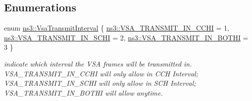 \subsection*{Enumerations}
\begin{DoxyCompactItemize}
\item 
enum \hyperlink{namespacens3_a417ab130a77d452a8b5014090665bcc1}{ns3\+::\+Vsa\+Transmit\+Interval} \{ \hyperlink{namespacens3_a417ab130a77d452a8b5014090665bcc1a2892e80beed7d3cc2ec6a4b8acf05676}{ns3\+::\+V\+S\+A\+\_\+\+T\+R\+A\+N\+S\+M\+I\+T\+\_\+\+I\+N\+\_\+\+C\+C\+HI} = 1, 
\hyperlink{namespacens3_a417ab130a77d452a8b5014090665bcc1ad75f8ae4d4ec6a1ded6834e982a7149d}{ns3\+::\+V\+S\+A\+\_\+\+T\+R\+A\+N\+S\+M\+I\+T\+\_\+\+I\+N\+\_\+\+S\+C\+HI} = 2, 
\hyperlink{namespacens3_a417ab130a77d452a8b5014090665bcc1aae42365483bb4ad44a43f5e31f4a3495}{ns3\+::\+V\+S\+A\+\_\+\+T\+R\+A\+N\+S\+M\+I\+T\+\_\+\+I\+N\+\_\+\+B\+O\+T\+HI} = 3
 \}\begin{DoxyCompactList}\small\item\em indicate which interval the V\+SA frames will be transmitted in. V\+S\+A\+\_\+\+T\+R\+A\+N\+S\+M\+I\+T\+\_\+\+I\+N\+\_\+\+C\+C\+HI will only allow in C\+CH Interval; V\+S\+A\+\_\+\+T\+R\+A\+N\+S\+M\+I\+T\+\_\+\+I\+N\+\_\+\+S\+C\+HI will only allow in S\+CH Interval; V\+S\+A\+\_\+\+T\+R\+A\+N\+S\+M\+I\+T\+\_\+\+I\+N\+\_\+\+B\+O\+T\+HI will allow anytime. \end{DoxyCompactList}
\end{DoxyCompactItemize}
